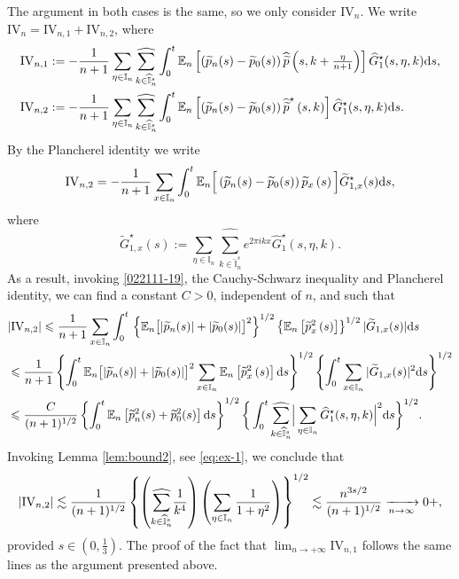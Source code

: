 \documentclass[EJP]{ejpecp} %
\newcommand{\bb}[1]{{\mathbb #1}}
\newcommand\T{{\mathbb I}}
\renewcommand{\le}{\leqslant}
\newcommand{\dd  }{\mathrm{d}}
\renewcommand{\hat}{\widehat}
\renewcommand{\tilde}{\widetilde}
\numberwithin{equation}{section}
\begin{document}
The argument in both cases is the same, so we only consider $\mathrm{IV}_{n}$.
We  write $\mathrm{IV}_{n}=\mathrm{IV}_{n,1}+\mathrm{IV}_{n,2} $, where
\begin{align*}
\mathrm{IV}_{n,1}&:=-\frac{1}{n+1}\sum_{\eta\in\T_n}\underset{{k\in \widehat{\T}_n^s}}{{\hat\sum}}\int_0^t
\vphantom{\int}
\bb E_n\left[
    \left(\tilde p_n(s)-\tilde
  p_0(s)\right)\hat{\tilde{p}}\left(s,k+\tfrac{\eta}{n+1}\right)\right] \hat G_1^\star(s,\eta,k)\dd s,\\
\mathrm{IV}_{n,2}&:=-\frac{1}{n+1}\sum_{\eta\in\T_n}\underset{{k\in \widehat{\T}_n^s}}{{\hat\sum}}\int_0^t\vphantom{\int}
\bb E_n\left[\left(\tilde p_n(s)-\tilde
  p_0(s)\right)\hat{\tilde{p}}^\star\left(s,k\right)\right]\hat
  G_1^\star(s,\eta,k)\dd s.
\end{align*}
By the Plancherel identity we  write
\begin{equation*}
\mathrm{IV}_{n,2}=-\frac{1}{n+1}\sum_{x \in 
  \T_n}\int_0^t\vphantom{\int}
\bb E_n\Big[\left(\tilde p_n(s)-\tilde
  p_0(s)\right)\tilde{p}_x\left(s\right)\Big]\tilde
  G_{1,x}^\star(s)\dd s,
\end{equation*}
where
$$
\tilde
  G_{1,x}^\star(s):=\sum_{\eta\in\T_n}\underset{{k\in \widehat{\T}_n^s}}{{\hat\sum}}e^{2\pi i k x}\hat
  G_1^\star(s,\eta,k).
$$
As a result, invoking \eqref{022111-19}, the Cauchy-Schwarz inequality and
Plancherel identity,
we can find a constant $C>0$, independent of $n$, and such that
\begin{align*}
&
|\mathrm{IV}_{n,2}|\le \frac{1}{n+1}\sum_{x \in 
  \T_n}\int_0^t\vphantom{\int}
\left\{\bb E_n\big[|\tilde p_n(s)|+|\tilde
  p_0(s)|\big]^2 \right\}^{1/2}\left\{\bb E_n\left[\tilde{p}_x^2\left(s\right)\right]\right\}^{1/2}|\tilde
  G_{1,x}(s)|\dd s\\
&
\le \frac{1}{n+1}\vphantom{\int}
\left\{\int_0^t \bb E_n\big[|\tilde p_n(s)|+|\tilde
  p_0(s)|\big]^2\sum_{x \in 
  \T_n}\bb E_n\left[\tilde{p}_x^2\left(s\right)\right]\dd s\right\}^{1/2}\left\{\int_0^t\sum_{x \in 
  \T_n}|\tilde
  G_{1,x}(s)|^2 \dd s \right\}^{1/2}
\\
&
\le  \frac{C}{(n+1)^{1/2}}\vphantom{\int}
\left\{\int_0^t\bb E_n\left[\tilde p^2_n(s)+\tilde
  p_0^2(s)\right] \dd s\right\}^{1/2}\bigg\{\int_0^t \underset{{k\in \widehat{\T}_n^s}}{{\hat\sum}}\Big|\sum_{\eta\in\T_n}\hat
  G_1^\star(s,\eta,k)\Big|^2 \dd s \bigg\}^{1/2}.
\end{align*}
Invoking Lemma \ref{lem:bound2}, see \eqref{eq:ex-1}, we conclude that
\begin{equation*}
|\mathrm{IV}_{n,2}|
\lesssim   \frac{1}{(n+1)^{1/2}}\vphantom{\int}
\left\{\left( \underset{{k\in \widehat{\T}_n^s}}{{\hat\sum}}\frac{1}{k^4}\right)\left(\sum_{\eta\in\T_n}\frac{1}{1+\eta^2}\right)
  \right\}^{1/2}\lesssim \frac{n^{3s/2}}{(n+1)^{1/2}}\xrightarrow[n\to\infty]{} 0+, 
\end{equation*}
provided $s\in(0,\frac13)$. The proof of the fact that $\lim_{n\to+\infty}\mathrm{IV}_{n,1}$ follows the same lines as the argument presented
above. 
\end{document}
